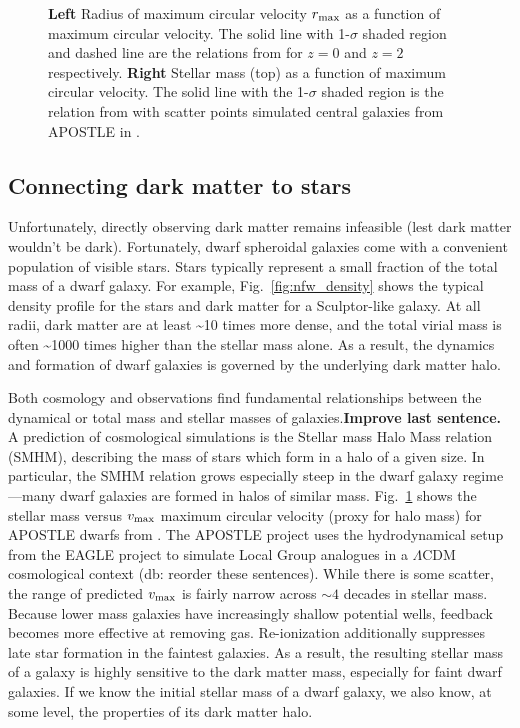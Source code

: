 \begin{figure}
\centering
{}
\caption[Stellar-mass halo-mass relation]{\textbf{Left} Radius of
maximum circular velocity \(r_{\rm max}\) as a function of maximum
circular velocity. The solid line with 1-\(\sigma\) shaded region and
dashed line are the relations from \citet{ludlow+2016} for \(z=0\) and
\(z=2\) respectively. \textbf{Right} Stellar mass (top) as a function of
maximum circular velocity. The solid line with the 1-\(\sigma\) shaded
region is the relation from \citet{fattahi+2018} with scatter points
simulated central galaxies from APOSTLE in
\citet{fattahi+2018}.}\label{fig:smhm}
\end{figure}

\subsection{Connecting dark matter to
stars}\label{connecting-dark-matter-to-stars}

Unfortunately, directly observing dark matter remains infeasible (lest
dark matter wouldn't be dark). Fortunately, dwarf spheroidal galaxies
come with a convenient population of visible stars. Stars typically
represent a small fraction of the total mass of a dwarf galaxy. For
example, Fig.~\ref{fig:nfw_density} shows the typical density profile
for the stars and dark matter for a Sculptor-like galaxy. At all radii,
dark matter are at least \textasciitilde10 times more dense, and the
total virial mass is often \textasciitilde1000 times higher than the
stellar mass alone. As a result, the dynamics and formation of dwarf
galaxies is governed by the underlying dark matter halo.

Both cosmology and observations find fundamental relationships between
the dynamical or total mass and stellar masses of
galaxies.\textbf{Improve last sentence.} A prediction of cosmological
simulations is the Stellar mass Halo Mass relation (SMHM), describing
the mass of stars which form in a halo of a given size. In particular,
the SMHM relation grows especially steep in the dwarf galaxy
regime---many dwarf galaxies are formed in halos of similar mass.
Fig.~\ref{fig:smhm} shows the stellar mass versus \(v_{\rm max}\)
maximum circular velocity (proxy for halo mass) for APOSTLE dwarfs from
\citet{fattahi+2018}. The APOSTLE project \citep{sawala+2016} uses the
hydrodynamical setup from the EAGLE project
\citep{crain+2015, schaye+2015} to simulate Local Group analogues in a
\(\Lambda\)CDM cosmological context (db: reorder these sentences). While
there is some scatter, the range of predicted \(v_{\rm max}\) is fairly
narrow across \(\sim 4\) decades in stellar mass. Because lower mass
galaxies have increasingly shallow potential wells, feedback becomes
more effective at removing gas. Re-ionization additionally suppresses
late star formation in the faintest galaxies. As a result, the resulting
stellar mass of a galaxy is highly sensitive to the dark matter mass,
especially for faint dwarf galaxies. If we know the initial stellar mass
of a dwarf galaxy, we also know, at some level, the properties of its
dark matter halo.

